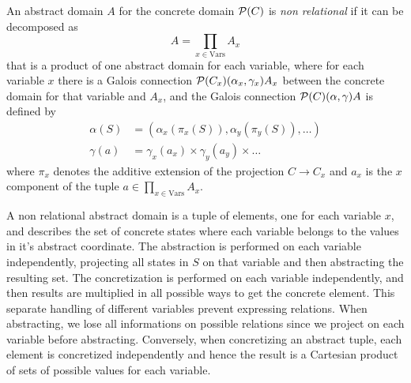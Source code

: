 \begin{definition}
	An abstract domain $A$ for the concrete domain $\mathcal{P}(C)$ is \textit{non relational} if it can be decomposed as
	\[
	A = \prod\limits_{x \in \text{Vars}} A_x
	\]
	that is a product of one abstract domain for each variable, where for each variable $x$ there is a Galois connection $\mathcal{P}(C_x) (\alpha_x, \gamma_x) A_x$ between the concrete domain for that variable and $A_x$, and the Galois connection $\mathcal{P}(C) (\alpha, \gamma) A$ is defined by
	\begin{align*}
		\alpha(S) &= (\alpha_x(\pi_x(S)), \alpha_y(\pi_y(S)), \dots) \\
		\gamma(a) &= \gamma_x(a_x) \times \gamma_y(a_y) \times \dots
	\end{align*}
	where $\pi_x$ denotes the additive extension of the projection $C \rightarrow C_x$ and $a_x$ is the $x$ component of the tuple $a \in \prod\limits_{x \in \text{Vars}} A_x$.
\end{definition}

A non relational abstract domain is a tuple of elements, one for each variable $x$, and describes the set of concrete states where each variable belongs to the values in it's abstract coordinate. The abstraction is performed on each variable independently, projecting all states in $S$ on that variable and then abstracting the resulting set. The concretization is performed on each variable independently, and then results are multiplied in all possible ways to get the concrete element.
This separate handling of different variables prevent expressing relations. When abstracting, we lose all informations on possible relations since we project on each variable before abstracting. Conversely, when concretizing an abstract tuple, each element is concretized independently and hence the result is a Cartesian product of sets of possible values for each variable.


